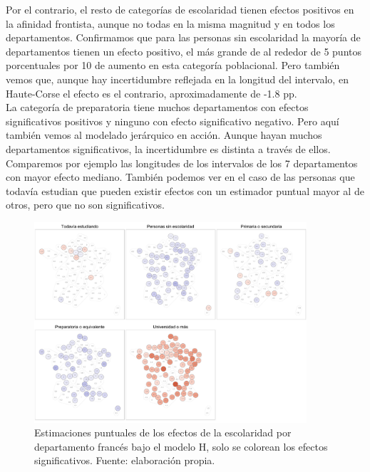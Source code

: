 Por el contrario, el resto de categorías de escolaridad tienen efectos positivos en la afinidad frontista, aunque no todas en la misma magnitud y en todos los departamentos. Confirmamos que para las personas sin escolaridad la mayoría de departamentos tienen un efecto positivo, el más grande de al rededor de 5 puntos porcentuales por 10 de aumento en esta categoría poblacional. Pero también vemos que, aunque hay incertidumbre reflejada en la longitud del intervalo, en Haute-Corse el efecto es el contrario, aproximadamente de -1.8 pp.\\ 

La categoría de preparatoria tiene muchos departamentos con efectos significativos positivos y ninguno con efecto significativo negativo. Pero aquí también vemos al modelado jerárquico en acción. Aunque hayan muchos departamentos significativos, la incertidumbre es distinta a través de ellos. Comparemos por ejemplo las longitudes de los intervalos de los 7 departamentos con mayor efecto mediano. También podemos ver en el caso de las personas que todavía estudian que pueden existir efectos con un estimador puntual mayor al de otros, pero que no son significativos.\\

\begin{figure}[h]
	\centering
	\includegraphics[width = 0.9\textwidth]{Figs/Efectos/Dorling_Efectos_Escolaridad_Modelo_H}
	\caption{Estimaciones puntuales de los efectos de la escolaridad por departamento francés bajo el modelo H, solo se colorean los efectos significativos. Fuente: elaboración propia.}
	\label{fig:Dorling_Efectos_Escolaridad}
\end{figure}

